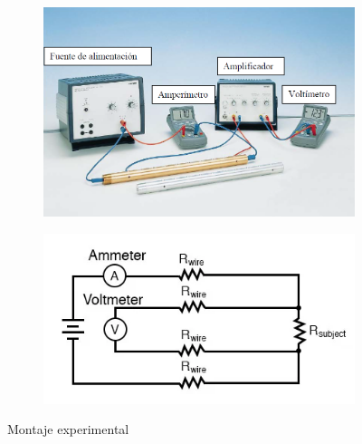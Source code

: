 \documentclass[a4paper,12pt,titlepage]{report}
\begin{document}
\begin{figure}[h!]
    \begin{subfigure}{0.5\textwidth}
        \centering
        \includegraphics[width=1\linewidth]{Images/montaje experimental.png}
    \end{subfigure}
    \begin{subfigure}{0.42\textwidth}
        \centering
        \includegraphics[width=1.5\linewidth]{Images/ohmmeter-example3.png}
    \end{subfigure}
    \caption{Montaje experimental}
    \label{Circuito}
\end{figure}
\end{document}
